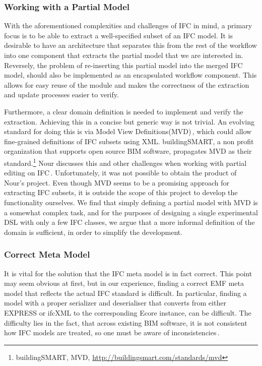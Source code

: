 \subsubsection{Working with a Partial Model}
With the aforementioned complexities and challenges of IFC in mind, a primary focus is to be able to extract a well-specified subset of an IFC model. It is desirable to have an architecture that separates this from the rest of the workflow into one component that extracts the partial model that we are interested in. Reversely, the problem of re-inserting this partial model into the merged IFC model, should also be implemented as an encapsulated workflow component. This allows for easy reuse of the module and makes the correctness of the extraction and update processes easier to verify.

Furthermore, a clear domain definition is needed to implement and verify the extraction. Achieving this in a concise but generic way is not trivial. An evolving standard for doing this is via Model View Definitions(MVD)\,\cite{nour08}, which could allow fine-grained definitions of IFC subsets using XML. buildingSMART, a non profit organization that supports open source BIM software, propagates MVD as their standard.\footnote{buildingSMART, MVD, \url{http://buildingsmart.com/standards/mvd}} Nour discusses this and other challenges when working with partial editing on IFC\,\cite{nour08}.  Unfortunately, it was not possible to obtain the product of Nour's project. Even though MVD seems to be a promising approach for extracting IFC subsets, it is outside the scope of this project to develop the functionality ourselves. We find that simply defining a partial model with MVD is a somewhat complex task, and for the purposes of designing a single experimental DSL with only a few IFC classes, we argue that a more informal definition of the domain is sufficient, in order to simplify the development.

\subsubsection{Correct Meta Model}
It is vital for the solution that the IFC meta model is in fact correct. This point may seem obvious at first, but in our experience, finding a correct EMF meta model that reflects the actual IFC standard is difficult. In particular, finding a model with a proper serializer and deserialiser that converts from either EXPRESS or ifcXML to the corresponding Ecore instance, can be difficult. The difficulty lies in the fact, that across existing BIM software, it is not consistent how IFC models are treated, so one must be aware of inconsistencies\,\cite[p. 4]{quteprints37725}.


